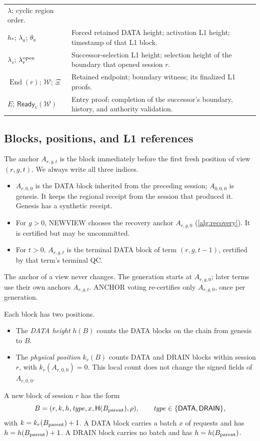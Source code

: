 \documentclass[11pt,a4paper]{article}
\newcommand{\Hash}{\mathsf H}
\newcommand{\End}{\operatorname{End}}
\newcommand{\tagg}[1]{\ensuremath{\mathsf{#1}}}
\begin{document}
\begin{table}[htbp]
\begin{tabularx}{\linewidth}{@{}p{.29\linewidth}Y@{}}
$\lambda$; cyclic region order.\\
$h_*$; $\lambda_a$; $\theta_a$ & Forced retained DATA height;
activation L1 height; timestamp of that L1 block.\\
$\lambda_s$; $\lambda_r^{\rm open}$ & Successor-selection L1 height;
selection height of the boundary that opened session $r$.\\
$\End(r)$; $\mathcal W$; $\Xi$ & Retained endpoint; boundary witness;
its finalized L1 proofs.\\
$E$; $\tagg{Ready}_v(\mathcal W)$ & Entry proof; completion of the
successor's boundary, history, and authority validation.\\
\bottomrule
\end{tabularx}
\end{table}

\subsection{Blocks, positions, and L1 references}
\label{sec:blocks}
The anchor $A_{r,g,t}$ is the block immediately before the first fresh
position of view $(r,g,t)$. We always write all three indices.
\begin{itemize}
\item $A_{r,0,0}$ is the DATA block inherited from the preceding
session; $A_{0,0,0}$ is genesis. It keeps the regional receipt from the
session that produced it. Genesis has a synthetic receipt.
\item For $g>0$, NEWVIEW chooses the recovery anchor $A_{r,g,0}$
(\cref{alg:recovery}). It is certified but may be uncommitted.
\item For $t>0$, $A_{r,g,t}$ is the terminal DATA block of term
$(r,g,t-1)$, certified by that term's terminal QC.
\end{itemize}
The anchor of a view never changes. The generation starts at
$A_{r,g,0}$; later terms use their own anchors $A_{r,g,t}$. ANCHOR voting
re-certifies only $A_{r,g,0}$, once per generation.

Each block has two positions.
\begin{itemize}
\item The \emph{DATA height} $h(B)$ counts the DATA blocks on the chain
from genesis to $B$.
\item The \emph{physical position} $k_r(B)$ counts DATA and DRAIN blocks
within session $r$, with $k_r(A_{r,0,0})=0$. This local count does not change
the signed fields of $A_{r,0,0}$.
\end{itemize}
A new block of session $r$ has the form
\[
 B=(r,k,h,\mathit{type},x,\Hash(B_{\rm parent}),\rho),
 \qquad \mathit{type}\in\{\tagg{DATA},\tagg{DRAIN}\},
\]
with $k=k_r(B_{\rm parent})+1$. A DATA block carries a batch $x$ of
requests and has $h=h(B_{\rm parent})+1$. A DRAIN block carries no batch
and has $h=h(B_{\rm parent})$.
\end{document}

